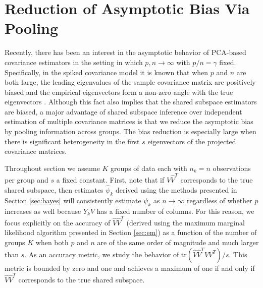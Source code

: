 \documentclass[12pt]{article}
\newcommand{\tr}{\text{tr}}
\begin{document}
\section{Reduction of Asymptotic Bias Via Pooling}
\label{sec:asymp}
Recently, there has been an interest in the asymptotic behavior of
PCA-based covariance estimators in the setting in which
$p, n \to \infty$ with $p/n=\gamma$ fixed.  Specifically, in the
spiked covariance model it is known that when $p$ and $n$ are both
large, the leading eigenvalues of the sample covariance matrix are
positively biased and the empirical eigenvectors form a non-zero angle
with the true eigenvectors \citep{Baik2006, Paul2007}.  Although this
fact also implies that the shared subspace estimators are biased, a
major advantage of shared subspace inference over independent
estimation of multiple covariance matrices is that we reduce the
asymptotic bias by pooling information across groups.  The bias
reduction is especially large when there is significant heterogeneity
in the first $s$ eigenvectors of the projected covariance matrices.

Throughout section we assume $K$ groups of data each with $n_k = n$
observations per group and $s$ a fixed constant.  First, note that if
$\hat{V}\hat{V}^T$ corresponds to the true shared subspace, then
estimates $\hat{\psi}_k$ derived using the methods presented in
Section \ref{sec:bayes} will consistently estimate $\psi_k$ as
$n \to \infty$ regardless of whether $p$ increases as well because
$Y_kV$ has a fixed number of columns.  For this reason, we focus
explicitly on the accuracy of $\hat{V}\hat{V}^T$ (derived using the
maximum marginal likelihood algorithm presented in Section
\ref{sec:em}) as a function of the number of groups $K$ when both $p$
and $n$ are of the same order of magnitude and much larger than $s$.
As an accuracy metric, we study the behavior of
$\tr(\hat{V}\hat{V}^TVV^T)/s$.  This metric is bounded by zero and one
and achieves a maximum of one if and only if $\hat{V}\hat{V}^T$
corresponds to the true shared subspace.
\end{document}
